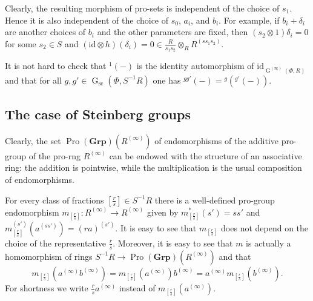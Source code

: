 \documentclass[oneside, 11pt]{amsart}
\numberwithin{equation}{section}
\theoremstyle{definition}
\theoremstyle{remark}
\DeclareMathOperator\GG{G}
\DeclareMathOperator{\Pro}{Pro}
\newcommand{\Group}{\mathbf{Grp}}
\newcommand{\up}[2]{{^{#1}\!{#2}}}
\begin{document}
Clearly, the resulting morphism of pro-sets is independent of the choice of \(s_1\). Hence it is also independent of the choice of \(s_0\), \(a_i\), and \(b_i\). For example, if \(b_i + \delta_i\) are another choices of \(b_i\) and the other parameters are fixed, then \((s_2 \otimes 1) \delta_i = 0\) for some \(s_2 \in S\) and \((\mathrm{id} \otimes h)(\delta_i) = 0 \in \frac R{s_1 s_2} \otimes_R R^{(s s_1 s_2)}\). 

It is not hard to check that $\up 1{(-)}$ is the identity automorphism of $\mathrm{id}_{\GG^{(\infty)}(\Phi, R)}$ and that for all \(g, g' \in \GG_{\mathrm{sc}}(\Phi, S^{-1} R)\) one has $\up{gg'}{(-)} = \up{g}{(\up{g'}{(-)})}$.

\subsection{The case of Steinberg groups}
Clearly, the set $\Pro(\Group)(R^{(\infty)})$ of endomorphisms of the additive pro-group of the pro-rng $R^{(\infty)}$ can be endowed with the structure of an associative ring: the addition is 
pointwise, 
while the multiplication is the usual composition of endomorphisms.

For every class of fractions \([\frac rs] \in S^{-1} R\) there is a well-defined pro-group endomorphism \(m_{[\frac rs]} \colon R^{(\infty)} \to R^{(\infty)}\) given by \(m_{[\frac rs]}^*(s') = ss'\) and \(m_{[\frac rs]}^{(s')}(a^{(ss')}) = (ra)^{(s')}\). It is easy to see that $m_{[\frac{r}{s}]}$ does not depend on the choice of the representative \(\tfrac r s\). Moreover, it is easy to see that \(m\) is actually a homomorphism of rings \(S^{-1} R \to \Pro(\Group)(R^{(\infty)})\) and that 
\begin{equation} \label{eq:m-mult} m_{[\frac rs]}(a^{(\infty)} b^{(\infty)}) = m_{[\frac rs]}(a^{(\infty)}) b^{(\infty)} = a^{(\infty)} m_{[\frac rs]}(b^{(\infty)}).\end{equation}
For shortness we write \(\frac rs a^{(\infty)}\) instead of \(m_{[\frac rs]}(a^{(\infty)})\). 
\end{document}
